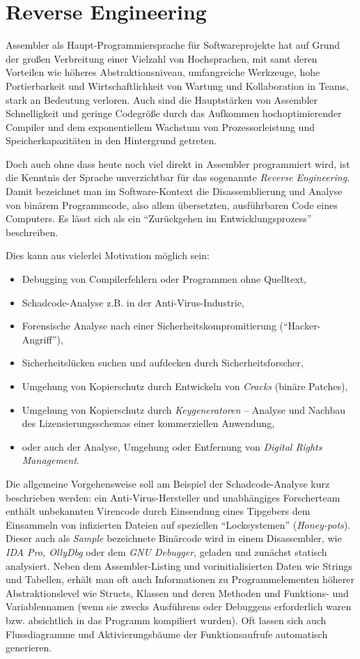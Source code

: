 \section{Reverse Engineering}
Assembler als Haupt-Programmiersprache für Softwareprojekte hat auf Grund der großen Verbreitung einer Vielzahl von Hochsprachen, mit samt deren Vorteilen wie höheres Abstraktionsniveau, umfangreiche Werkzeuge, hohe Portierbarkeit und Wirtschaftlichkeit von Wartung und Kollaboration in Teams, stark an Bedeutung verloren. Auch sind die Hauptstärken von Assembler Schnelligkeit und geringe Codegröße durch das Aufkommen hochoptimierender Compiler und dem exponentiellem Wachstum von Prozessorleistung und Speicherkapazitäten in den Hintergrund getreten.

Doch auch ohne dass heute noch viel direkt in Assembler programmiert wird, ist die Kenntnis der Sprache unverzichtbar für das sogenannte \emph{Reverse Engineering}. Damit bezeichnet man im Software-Kontext die Disassemblierung und Analyse von binärem Programmcode, also allem übersetzten, ausführbaren Code eines Computers. Es lässt sich als ein ``Zurückgehen im Entwicklungsprozess'' beschreiben.\cite{Warden1992}

Dies kann aus vielerlei Motivation möglich sein:
\begin{itemize}
\item Debugging von Compilerfehlern oder Programmen ohne Quelltext,
\item Schadcode-Analyse z.B. in der Anti-Virus-Industrie,
\item Forensische Analyse nach einer Sicherheitskompromitierung (``Hacker-Angriff''),
\item Sicherheitslücken suchen und aufdecken durch Sicherheitsforscher,
\item Umgehung von Kopierschutz durch Entwickeln von \emph{Cracks} (binäre Patches),
\item Umgehung von Kopierschutz durch \emph{Keygeneratoren} – Analyse und Nachbau des Lizensierungsschemas einer kommerziellen Anwendung,
\item oder auch der Analyse, Umgehung oder Entfernung von \emph{Digital Rights Management}.
\end{itemize}

Die allgemeine Vorgehensweise soll am Beispiel der Schadcode-Analyse kurz beschrieben werden: ein Anti-Virus-Hersteller und unabhängiges Forscherteam enthält unbekannten Virencode durch Einsendung eines Tipgebers dem Einsammeln von infizierten Dateien auf speziellen ``Locksystemen'' (\emph{Honey-pots}). Dieser auch als \emph{Sample} bezeichnete Binärcode wird in einem Disassembler, wie \emph{IDA Pro, OllyDbg} oder dem \emph{GNU Debugger}\cite{disasm}, geladen und zunächst statisch analysiert. Neben dem Assembler-Listing und vorinitialisierten Daten wie Strings und Tabellen, erhält man oft auch Informationen zu Programmelementen höherer Abstraktionslevel wie Structs, Klassen und deren Methoden und Funktions- und Variablennamen (wenn sie zwecks Ausführens oder Debuggens erforderlich waren bzw. absichtlich in das Programm kompiliert wurden).
Oft lassen sich auch Flussdiagramme und Aktivierungsbäume der Funktionsaufrufe automatisch generieren.

